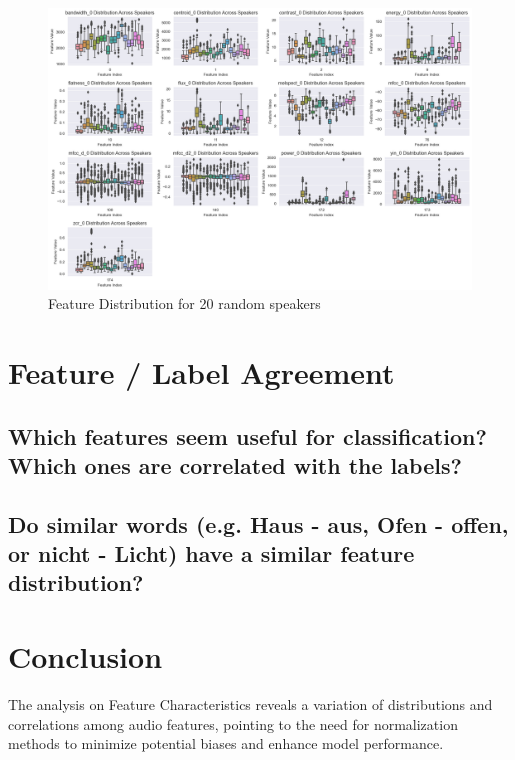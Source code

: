 \documentclass{article}
\begin{document}
\begin{figure}[ht]
\centering
\includegraphics[width=1\linewidth]{IMG/3c.png}
\caption{Feature Distribution for 20 random speakers}
\label{fig:3c}
\end{figure}

\section{Feature / Label Agreement}
\subsection{Which features seem useful for classification? Which ones are correlated with
the labels?}
\subsection{Do similar words (e.g. Haus - aus, Ofen - offen, or nicht - Licht) have a similar
feature distribution?}

\section{Conclusion}
The analysis on Feature Characteristics reveals a variation of distributions and correlations among audio features, pointing to the need for normalization methods to minimize potential biases and enhance model performance.

\end{document}
